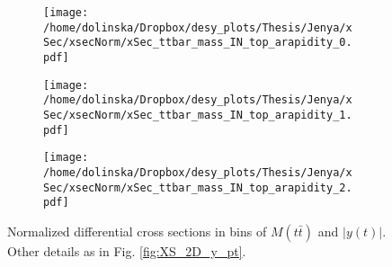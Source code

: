 
\begin{figure}[H]
\centering
\begin{subfigure}
  \centering
  \texttt{[image: /home/dolinska/Dropbox/desy\_plots/Thesis/Jenya/xSec/xsecNorm/xSec\_ttbar\_mass\_IN\_top\_arapidity\_0.pdf]}
\end{subfigure}
\begin{subfigure}
  \centering
  \texttt{[image: /home/dolinska/Dropbox/desy\_plots/Thesis/Jenya/xSec/xsecNorm/xSec\_ttbar\_mass\_IN\_top\_arapidity\_1.pdf]}
\end{subfigure}
\begin{subfigure}
  \centering
  \texttt{[image: /home/dolinska/Dropbox/desy\_plots/Thesis/Jenya/xSec/xsecNorm/xSec\_ttbar\_mass\_IN\_top\_arapidity\_2.pdf]}
\end{subfigure}
\caption{Normalized differential cross sections in bins of $M(t\bar{t})$ and $|y(t)|$. Other details as in Fig. \ref{fig:XS_2D_y_pt}.}
\label{fig:XS_2D_Mtt_yt}
\end{figure}

